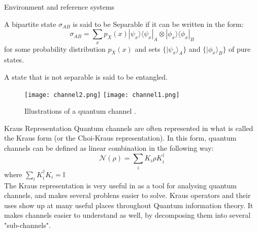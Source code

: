 \begin{frame}{Environment and reference systems}
    \begin{definition}
        A bipartite state $\sigma_{AB}$ is said to be Separable if it can be written in the form:
        \begin{equation*}
            \sigma_{AB} = \displaystyle\sum_{x} p_X(x)|\psi_x\rangle\langle\psi_x|_A \otimes |\phi_x\rangle\langle\phi_x|_B
        \end{equation*}
        for some probability distribution $p_X(x)$ and sets $\{| \psi_x \rangle_A\}$ and $\{| \phi_x \rangle_B\}$ of pure states.
    \end{definition}

    \begin{definition}[Entanglement]
        A state that is not separable is said to be entangled.
    \end{definition}
\end{frame}

\begin{frame}
    \begin{figure}
        \texttt{[image: channel2.png]}
        \texttt{[image: channel1.png]}
        \caption{Illustrations of a quantum channel \cite{Gyongyosi_2018}.}
    \end{figure}
\end{frame}

\begin{frame}{Kraus Representation}
    Quantum channels are often represented in what is called the Kraus form (or the Choi-Kraus representation). In this form, quantum channels can be defined
    as linear combination in the following way:
    \begin{equation*}
        \mathcal{N}(\rho) = \sum_i K_i \rho K_i^\dagger 
    \end{equation*}
    where $\sum_i K_i^\dagger K_i = \mathbb{I} $\\
    The Kraus representation is very useful in as a tool for analysing quantum channels, and makes several problens easier to solve. Kraus operators and their
    uses show up at many useful places throughout Quantum information theory. It makes channels easier to understand as well, by decomposing them into several
    "sub-channels".
\end{frame}

\renewcommand{\pageauthor}{Yash Seri}

